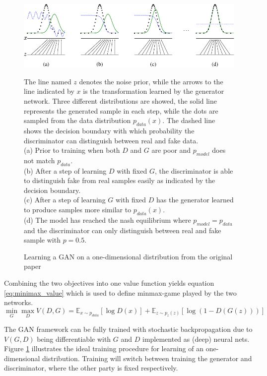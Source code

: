 \begin{figure}[htb]
\centering
  \includegraphics[width=\linewidth]{media/gan_training-crop}
  \caption[Learning Procedure in a GAN]{Learning a GAN on a one-dimensional distribution from the original paper\cite{gan:2014}}
  \label{fig:gan_training}
  \medskip
  \small
  The line named $z$ denotes the noise prior, while the arrows to the line indicated by $x$ is the transformation learned by the generator network. Three different distributions are showed, the solid line represents the generated sample in each step, while the dots are sampled from the data distribution $p_{data}(x)$. The dashed line shows the decision boundary with which probability the discriminator can distinguish between real and fake data.\\
  (a) Prior to training when both $D$ and $G$ are poor and $p_{model}$ does not match $p_{data}$.\\
  (b) After a step of learning $D$ with fixed $G$, the discriminator is able to distinguish fake from real samples easily as indicated by the decision boundary.\\
  (c) After a step of learning $G$ with fixed $D$ has the generator learned to produce samples more similar to $p_{data}(x)$.\\
  (d) The model has reached the nash equilibrium where $p_{model} = p_{data}$ and the discriminator can only distinguish between real and fake sample with $p=0.5$.
\end{figure}


Combining the two objectives into one value function yields equation \ref{eq:minimax_value} which is used to define minmax-game played by the two networks.
\begin{equation}
\label{eq:minimax_value}
\min_G \max_D V(D,G) = \mathbb{E}_{x \sim p_{data}}[\log D(x)] + \mathbb{E}_{z \sim p_z(z)}[\log(1 - D(G(z)))]
\end{equation}

The GAN framework can be fully trained with stochastic backpropagation due to $V(G,D)$ being differentiable with $G$ and $D$ implemented as (deep) neural nets.
Figure \ref{fig:gan_training} illustrates the ideal training procedure for learning of an one-dimensional distribution.
Training will switch between training the generator and discriminator, where the other party is fixed respectively.

